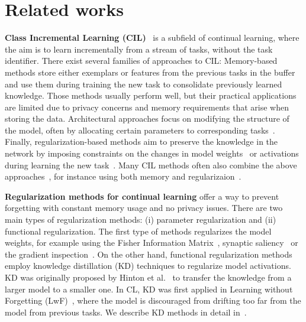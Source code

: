 \documentclass[10pt,twocolumn,letterpaper]{article}
\newcommand\todo[1]{{\color{red} [\bf TODO: #1]}}
\begin{document}
\section{Related works}

\textbf{Class Incremental Learning (CIL)}~\cite{van2019three,masana2022class} is a subfield of continual learning, where the aim is to learn incrementally from a stream of tasks, without the task identifier. 
There exist several families of approaches to CIL:
Memory-based methods store either exemplars or features from the previous tasks in the buffer~\cite{rebuffi2017icarl,iscen2022memory,bang2021rainbow,prabhu2020gdumb} and use them during training the new task to consolidate previously learned knowledge. Those methods usually perform well, but their practical applications are limited due to privacy concerns and memory requirements that arise when storing the data. Architectural approaches focus on modifying the structure of the model, often by allocating certain parameters to corresponding tasks~\cite{wang2022learning,wang2022dualprompt}. Finally, regularization-based methods aim to preserve the knowledge in the network by imposing constraints on the changes in model weights~\cite{kirkpatrick2017overcoming} or activations during learning the new task~\cite{li2017learning}. Many CIL methods often also combine the above approaches~\cite{castro2018end,Wu_2019_CVPR,rolnick2019experience}, for instance using both memory and regularizaion~\cite{rebuffi2017icarl,li2017learning,ahn2021ss}.

\textbf{Regularization methods for continual learning} offer a way to prevent forgetting with constant memory usage and no privacy issues. There are two main types of regularization methods: (i) parameter regularization and (ii) functional regularization. The first type of methods regularizes the model weights, for example using the Fisher Information Matrix~\cite{kirkpatrick2017overcoming}, synaptic saliency~\cite{zenke2017continual} or the gradient inspection~\cite{aljundi2018memory}. On the other hand, functional regularization methods employ knowledge distillation (KD) techniques to regularize model activations. KD was originally proposed by Hinton et al.~\cite{hinton2015distilling} to transfer the knowledge from a larger model to a smaller one. In CL, KD was first applied in Learning without Forgetting (LwF)~\cite{li2017learning}, where the model is discouraged from drifting too far from the model from previous tasks. We describe KD methods in detail in~.
\end{document}
